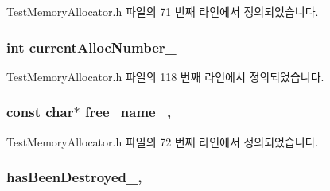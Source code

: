 Test\+Memory\+Allocator.\+h 파일의 71 번째 라인에서 정의되었습니다.

\subsubsection[{\texorpdfstring{current\+Alloc\+Number\+\_\+}{currentAllocNumber_}}]{\setlength{\rightskip}{0pt plus 5cm}int current\+Alloc\+Number\+\_\+\hspace{0.3cm}{\ttfamily [protected]}}\hypertarget{class_failable_memory_allocator_ac565cda74c1659a4c2400f97a8a0872b}{}\label{class_failable_memory_allocator_ac565cda74c1659a4c2400f97a8a0872b}


Test\+Memory\+Allocator.\+h 파일의 118 번째 라인에서 정의되었습니다.

\subsubsection[{\texorpdfstring{free\+\_\+name\+\_\+}{free_name_}}]{\setlength{\rightskip}{0pt plus 5cm}const char$\ast$ free\+\_\+name\+\_\+\hspace{0.3cm}{\ttfamily [protected]}, {\ttfamily [inherited]}}\hypertarget{class_test_memory_allocator_a4f7ece205625129df190e624cccf9286}{}\label{class_test_memory_allocator_a4f7ece205625129df190e624cccf9286}


Test\+Memory\+Allocator.\+h 파일의 72 번째 라인에서 정의되었습니다.

\subsubsection[{\texorpdfstring{has\+Been\+Destroyed\+\_\+}{hasBeenDestroyed_}}]{ has\+Been\+Destroyed\+\_\+\hspace{0.3cm}{\ttfamily [protected]}, {\ttfamily [inherited]}}\hypertarget{class_test_memory_allocator_a971604f223534e64d5024d63396b397a}{}\label{class_test_memory_allocator_a971604f223534e64d5024d63396b397a}


